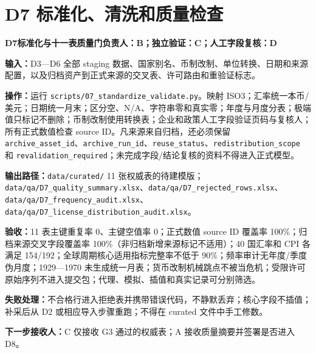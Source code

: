 \documentclass[UTF8,fontset=windows,12pt,openany]{ctexbook}
\newcommand{\Field}[1]{{\small\nolinkurl{#1}}}
\newcommand{\File}[1]{{\small\begingroup\urlstyle{same}\nolinkurl{#1}\endgroup}}
\newcommand{\StepTitle}[3]{%
  \noindent\colorbox{DeepNavy}{\parbox{0.965\textwidth}{\color{white}\Large\bfseries #1\quad #2\hfill\normalsize #3}}\par\medskip
}
\newcommand{\CardRow}[2]{\noindent\textbf{#1：}#2\par}
\begin{document}
\newpage
\section{D7 标准化、清洗和质量检查}
\StepTitle{D7}{标准化与十一表质量门}{负责人：B；独立验证：C；人工字段复核：D}
\CardRow{输入}{D3—D6 全部 staging 数据、国家别名、币制改制、单位转换、日期和来源配置，以及归档资产到正式来源的交叉表、许可路由和重验证标志。}
\CardRow{操作}{运行 \File{scripts/07_standardize_validate.py}。映射 ISO3；汇率统一本币/美元；日期统一月末；区分空、N/A、字符串零和真实零；年度与月度分表；极端值只标记不删除；币制改制使用转换表；企业和政策人工字段验证页码与复核人；所有正式数值检查 source ID。凡来源来自归档，还必须保留 \Field{archive_asset_id}、\Field{archive_run_id}、\Field{reuse_status}、\Field{redistribution_scope} 和 \Field{revalidation_required}；未完成字段/结论复核的资料不得进入正式模型。}
\CardRow{输出路径}{\File{data/curated/} 11 张权威表的待建模版；\File{data/qa/D7_quality_summary.xlsx}、\File{data/qa/D7_rejected_rows.xlsx}、\File{data/qa/D7_frequency_audit.xlsx}、\File{data/qa/D7_license_distribution_audit.xlsx}。}
\CardRow{验收}{11 表主键重复率 0、主键空值率 0；正式数值 source ID 覆盖率 100\%；归档来源交叉字段覆盖率 100\%（非归档新增来源标记不适用）；40 国汇率和 CPI 各满足 154/192；全球周期核心适用指标完整率不低于 90\%；频率审计无年度/季度伪月度；1929—1970 未生成统一月表；货币改制机械跳点不被当危机；受限许可原始序列不进入提交包；代理、模拟、插值和真实记录可分别筛选。}
\CardRow{失败处理}{不合格行进入拒绝表并携带错误代码，不静默丢弃；核心字段不插值；补采后从 D2 或相应导入步骤重跑；不得在 curated 文件中手工修数。}
\CardRow{下一步接收人}{C 仅接收 G3 通过的权威表；A 接收质量摘要并签署是否进入 D8。}
\end{document}
